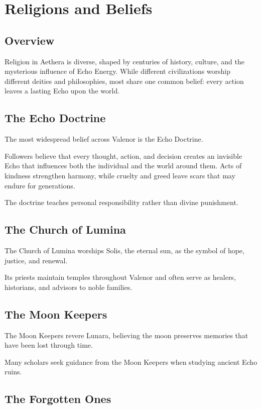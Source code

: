 \chapter{Religions and Beliefs}

\section{Overview}

Religion in Aethera is diverse, shaped by centuries of history, culture, and the mysterious influence of Echo Energy. While different civilizations worship different deities and philosophies, most share one common belief: every action leaves a lasting Echo upon the world.

\section{The Echo Doctrine}

The most widespread belief across Valenor is the Echo Doctrine.

Followers believe that every thought, action, and decision creates an invisible Echo that influences both the individual and the world around them. Acts of kindness strengthen harmony, while cruelty and greed leave scars that may endure for generations.

The doctrine teaches personal responsibility rather than divine punishment.

\section{The Church of Lumina}

The Church of Lumina worships Solis, the eternal sun, as the symbol of hope, justice, and renewal.

Its priests maintain temples throughout Valenor and often serve as healers, historians, and advisors to noble families.

\section{The Moon Keepers}

The Moon Keepers revere Lunara, believing the moon preserves memories that have been lost through time.

Many scholars seek guidance from the Moon Keepers when studying ancient Echo ruins.

\section{The Forgotten Ones}

